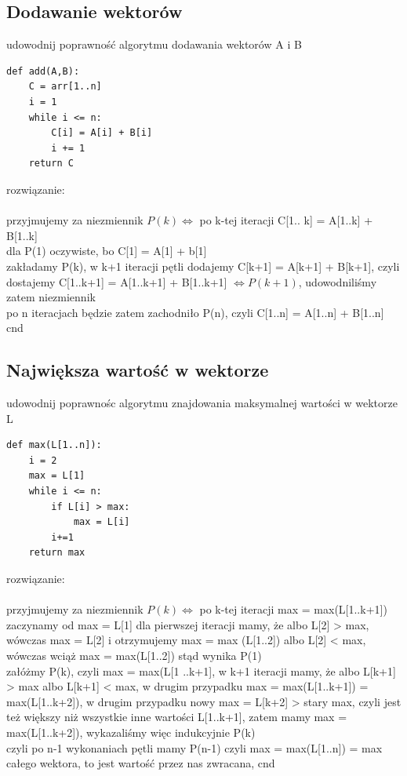 \documentclass{article}
\begin{document}
\subsection*{Dodawanie wektorów}
udowodnij poprawność algorytmu dodawania wektorów A i B
\begin{lstlisting}
def add(A,B):
	C = arr[1..n]
	i = 1
	while i <= n:
		C[i] = A[i] + B[i]
		i += 1
	return C
\end{lstlisting}
rozwiązanie: \\\\
przyjmujemy za niezmiennik $P(k) \iff$ po k-tej iteracji C[1.. k] = A[1..k] + B[1..k] \\
dla P(1) oczywiste, bo C[1] = A[1] + b[1] \\
zakładamy P(k), w k+1 iteracji pętli dodajemy C[k+1] = A[k+1] + B[k+1], czyli dostajemy C[1..k+1] = A[1..k+1] + B[1..k+1] $\iff P(k+1)$, 
udowodniliśmy zatem niezmiennik \\
po n iteracjach będzie zatem zachodniło P(n), czyli C[1..n] = A[1..n] + B[1..n] cnd

\subsection*{Największa wartość w wektorze}
udowodnij poprawnośc algorytmu znajdowania maksymalnej wartości w wektorze L
\begin{lstlisting}
def max(L[1..n]):
	i = 2
	max = L[1]
	while i <= n:
		if L[i] > max:
			max = L[i]
		i+=1
	return max
\end{lstlisting}
rozwiązanie: \\\\
przyjmujemy za niezmiennik $P(k) \iff$ po k-tej iteracji max = max(L[1..k+1]) \\
zaczynamy od max = L[1]
dla pierwszej iteracji mamy, że albo L[2] > max,  wówczas max = L[2] i otrzymujemy max = max (L[1..2]) albo L[2] < max, wówczas wciąż max = max(L[1..2]) 
stąd wynika P(1)
\\
załóżmy P(k), czyli max = max(L[1 ..k+1],  w k+1 iteracji mamy, że albo L[k+1] > max albo L[k+1] < max, w drugim przypadku max = max(L[1..k+1]) = max(L[1..k+2]), 
w drugim przypadku nowy max = L[k+2] > stary max, czyli jest też większy niż wszystkie inne wartości L[1..k+1], zatem mamy max = max(L[1..k+2]), 
wykazaliśmy więc indukcyjnie P(k) \\
czyli po n-1 wykonaniach pętli mamy P(n-1) czyli max = max(L[1..n]) = max całego wektora, to jest wartość przez nas zwracana, cnd
\end{document}
